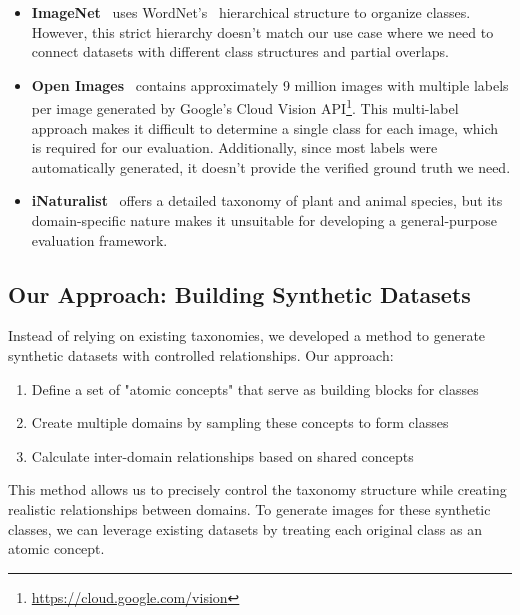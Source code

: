 \begin{itemize}
    \item \textbf{ImageNet}~\cite{deng_imagenet_2009,russakovsky_imagenet_2015}
          uses WordNet's~\cite{fellbaum_wordnet_1998} hierarchical structure to organize classes.
          However, this strict hierarchy doesn't match our use case where we need to connect
          datasets with different class structures and partial overlaps.

    \item \textbf{Open Images}~\cite{kuznetsova_open_2020} contains approximately 9 million
          images with multiple labels per image generated by Google's Cloud Vision API\footnote{\url{https://cloud.google.com/vision}}.
          This multi-label approach makes it difficult to determine a single class for each image,
          which is required for our evaluation. Additionally, since most labels were automatically
          generated, it doesn't provide the verified ground truth we need.

    \item \textbf{iNaturalist}~\cite{horn_inaturalist_2018} offers a detailed taxonomy of
          plant and animal species, but its domain-specific nature makes it unsuitable
          for developing a general-purpose evaluation framework.
\end{itemize}

\subsection{Our Approach: Building Synthetic Datasets}

Instead of relying on existing taxonomies, we developed a method to generate synthetic datasets with controlled relationships. Our approach:

\begin{enumerate}
    \item Define a set of "atomic concepts" that serve as building blocks for classes
    \item Create multiple domains by sampling these concepts to form classes
    \item Calculate inter-domain relationships based on shared concepts
\end{enumerate}

This method allows us to precisely control the taxonomy structure while creating realistic relationships between domains. To generate images for these synthetic classes, we can leverage existing datasets by treating each original class as an atomic concept.

